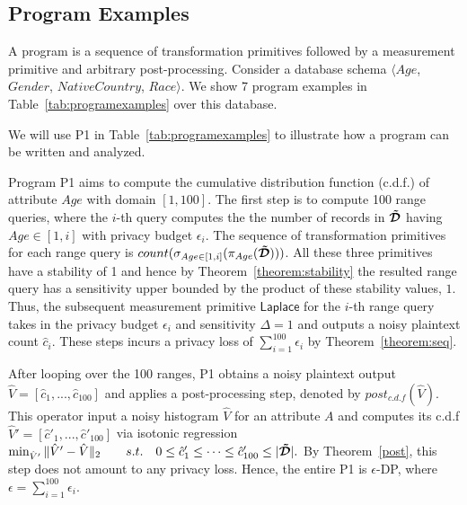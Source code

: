 \subsection{Program Examples}
A \system program is a sequence of transformation primitives followed by a measurement primitive and arbitrary post-processing. Consider a database schema $\langle Age$, $Gender$, $NativeCountry$, $Race\rangle$. We show 7 \system program examples in Table~\ref{tab:programexamples} over this database.

We will use P1 in Table~\ref{tab:programexamples} to illustrate how a \system program can be written and  analyzed. 

Program P1 aims to compute the cumulative distribution function (c.d.f.) of attribute $Age$ with domain $[1,100]$. The first step is to compute 100 range queries, where the $i$-th query computes the the number of records in $\boldsymbol{\tilde{\mathcal{D}}}$ having $Age \in [1,i]$ with privacy budget $\epsilon_i$.  The sequence of transformation primitives for each range query is $count(\sigma_{Age\in [1,i]}(\pi_{Age}(\boldsymbol{\tilde{\mathcal{D}}})))$. All these three primitives have a stability of 1 and hence by Theorem~\ref{theorem:stability} the resulted range query has a sensitivity upper bounded by the product of these stability values, $1$. Thus, the subsequent measurement primitive $\textsf{Laplace}$ for the $i$-th range query takes in the privacy budget $\epsilon_i$ and sensitivity $\Delta=1$ and outputs a noisy plaintext count $\hat{c}_i$. These steps incurs a privacy loss of $\sum_{i=1}^{100} \epsilon_i$ by Theorem~\ref{theorem:seq}.

After looping over the 100 ranges, P1 obtains a  noisy plaintext output $\hat{V}=[\hat{c}_1,...,\hat{c}_{100}]$ and applies a post-processing step, denoted by $post_{c.d.f}(\hat{V})$. This operator input a noisy histogram $\hat{V}$ for an attribute $A$ and computes its c.d.f $\hat{V}'=[\hat{c}'_1,...,\hat{c}'_{100}]$ via isotonic regression 
$\min_{\hat{V}'} \|\hat{V}'-\hat{V}\|_2 ~~~~~~s.t.~~~ 0\leq\hat{c}'_1\leq \cdots \leq \hat{c}'_{100} \leq |\boldsymbol{\tilde{\mathcal{D}}}|.$
By Theorem~\ref{post}, this step does not amount to any privacy loss. Hence, the entire P1 is $\epsilon$-DP, where $\epsilon=\sum_{i=1}^{100} \epsilon_i$. 

